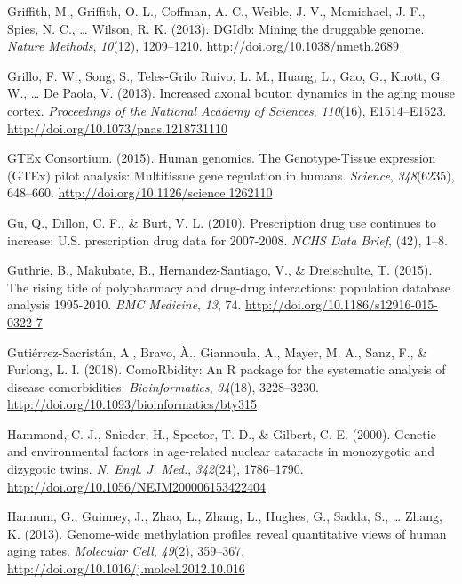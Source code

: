 \documentclass[12pt,twoside]{unicam}
\begin{document}
\begin{cslreferences}
\leavevmode\hypertarget{ref-Griffith2013}{}%
Griffith, M., Griffith, O. L., Coffman, A. C., Weible, J. V., Mcmichael, J. F., Spies, N. C., \ldots{} Wilson, R. K. (2013). DGIdb: Mining the druggable genome. \emph{Nature Methods}, \emph{10}(12), 1209--1210. \url{http://doi.org/10.1038/nmeth.2689}

\leavevmode\hypertarget{ref-Grillo2013}{}%
Grillo, F. W., Song, S., Teles-Grilo Ruivo, L. M., Huang, L., Gao, G., Knott, G. W., \ldots{} De Paola, V. (2013). Increased axonal bouton dynamics in the aging mouse cortex. \emph{Proceedings of the National Academy of Sciences}, \emph{110}(16), E1514--E1523. \url{http://doi.org/10.1073/pnas.1218731110}

\leavevmode\hypertarget{ref-GTEx_Consortium2015}{}%
GTEx Consortium. (2015). Human genomics. The Genotype-Tissue expression (GTEx) pilot analysis: Multitissue gene regulation in humans. \emph{Science}, \emph{348}(6235), 648--660. \url{http://doi.org/10.1126/science.1262110}

\leavevmode\hypertarget{ref-Gu2010}{}%
Gu, Q., Dillon, C. F., \& Burt, V. L. (2010). Prescription drug use continues to increase: U.S. prescription drug data for 2007-2008. \emph{NCHS Data Brief}, (42), 1--8.

\leavevmode\hypertarget{ref-Guthrie2015}{}%
Guthrie, B., Makubate, B., Hernandez-Santiago, V., \& Dreischulte, T. (2015). The rising tide of polypharmacy and drug-drug interactions: population database analysis 1995-2010. \emph{BMC Medicine}, \emph{13}, 74. \url{http://doi.org/10.1186/s12916-015-0322-7}

\leavevmode\hypertarget{ref-Gutierrez-Sacristan2018}{}%
Gutiérrez-Sacristán, A., Bravo, À., Giannoula, A., Mayer, M. A., Sanz, F., \& Furlong, L. I. (2018). ComoRbidity: An R package for the systematic analysis of disease comorbidities. \emph{Bioinformatics}, \emph{34}(18), 3228--3230. \url{http://doi.org/10.1093/bioinformatics/bty315}

\leavevmode\hypertarget{ref-Hammond2000}{}%
Hammond, C. J., Snieder, H., Spector, T. D., \& Gilbert, C. E. (2000). Genetic and environmental factors in age-related nuclear cataracts in monozygotic and dizygotic twins. \emph{N. Engl. J. Med.}, \emph{342}(24), 1786--1790. \url{http://doi.org/10.1056/NEJM200006153422404}

\leavevmode\hypertarget{ref-Hannum2013}{}%
Hannum, G., Guinney, J., Zhao, L., Zhang, L., Hughes, G., Sadda, S., \ldots{} Zhang, K. (2013). Genome-wide methylation profiles reveal quantitative views of human aging rates. \emph{Molecular Cell}, \emph{49}(2), 359--367. \url{http://doi.org/10.1016/j.molcel.2012.10.016}


\end{cslreferences}
\end{document}
